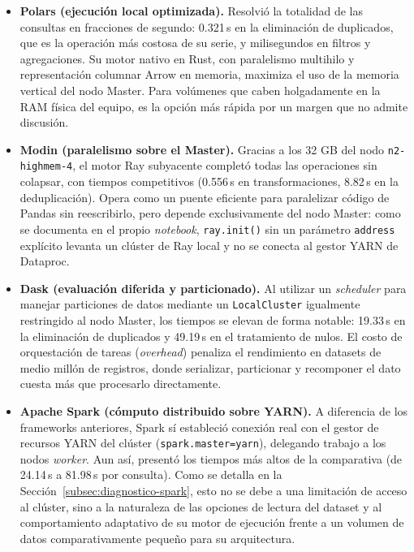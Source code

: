 \begin{itemize}[leftmargin=*]
    \item \textbf{Polars (ejecución local optimizada).} Resolvió la totalidad de las consultas en fracciones de segundo: 0.321\,s en la eliminación de duplicados, que es la operación más costosa de su serie, y milisegundos en filtros y agregaciones. Su motor nativo en Rust, con paralelismo multihilo y representación columnar Arrow en memoria, maximiza el uso de la memoria vertical del nodo Master. Para volúmenes que caben holgadamente en la RAM física del equipo, es la opción más rápida por un margen que no admite discusión.

    \item \textbf{Modin (paralelismo sobre el Master).} Gracias a los 32 GB del nodo \texttt{n2-highmem-4}, el motor Ray subyacente completó todas las operaciones sin colapsar, con tiempos competitivos (0.556\,s en transformaciones, 8.82\,s en la deduplicación). Opera como un puente eficiente para paralelizar código de Pandas sin reescribirlo, pero depende exclusivamente del nodo Master: como se documenta en el propio \textit{notebook}, \texttt{ray.init()} sin un parámetro \texttt{address} explícito levanta un clúster de Ray local y no se conecta al gestor YARN de Dataproc.

    \item \textbf{Dask (evaluación diferida y particionado).} Al utilizar un \textit{scheduler} para manejar particiones de datos mediante un \texttt{LocalCluster} igualmente restringido al nodo Master, los tiempos se elevan de forma notable: 19.33\,s en la eliminación de duplicados y 49.19\,s en el tratamiento de nulos. El costo de orquestación de tareas (\textit{overhead}) penaliza el rendimiento en datasets de medio millón de registros, donde serializar, particionar y recomponer el dato cuesta más que procesarlo directamente.

    \item \textbf{Apache Spark (cómputo distribuido sobre YARN).} A diferencia de los frameworks anteriores, Spark sí estableció conexión real con el gestor de recursos YARN del clúster (\texttt{spark.master=yarn}), delegando trabajo a los nodos \textit{worker}. Aun así, presentó los tiempos más altos de la comparativa (de 24.14\,s a 81.98\,s por consulta). Como se detalla en la Sección~\ref{subsec:diagnostico-spark}, esto no se debe a una limitación de acceso al clúster, sino a la naturaleza de las opciones de lectura del dataset y al comportamiento adaptativo de su motor de ejecución frente a un volumen de datos comparativamente pequeño para su arquitectura.
\end{itemize}

